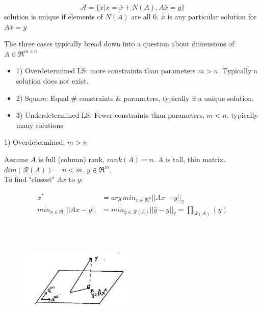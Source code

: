 \begin{equation*}
\mathcal{A} = \{x|x = \bar{x} + N(A), A\bar{x} = y \}
\end{equation*}
solution is unique if elements of $N(A)$ are all 0. $\bar{x}$ is any particular solution for $A\bar{x} =y$

The three cases typically bread down into a question about dimensions of $A\in \Re^{m\times n}$

\begin{itemize}
	\item 1) Overdetermined LS: more constraints than parameters $m>n$. Typically a solution does not exist. 
	
	\item 2) Square: Equal \# constraints \& parameters, typically $\exists$  a unique solution.
	
	\item 3) Underdetermined LS: Fewer constraints than parameters, $m<n$, typically many solutions
\end{itemize}

1) Overdetermined: $m > n$

Assume $A$ is full (column) rank, $rank(A) =n$. $A$ is tall, thin matrix. $dim(\mathcal{R}(A)) = n < m$. $y\in \Re^m$.\\

To find "closest" $Ax$ to $y$:

\begin{align*}
x^* &= arg \, min_{x\in \Re^n}||Ax - y||_2\\
min_{x\in \Re^{n}}||Ax - y|| &= min_{\hat{y}\in \mathcal{R}(A)}||\hat{y} - y||_2 =\prod_{\mathcal{R}(A)}(y)\\
\end{align*}

\begin{figure}
	\centering
	\includegraphics[width=2.1in,height=2.1in]{figures/ch06/figure1.png}
\end{figure}



